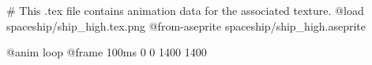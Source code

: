# This .tex file contains animation data for the associated texture.
@load spaceship/ship_high.tex.png
@from-aseprite spaceship/ship_high.aseprite

@anim loop
	@frame 100ms 0 0 1400 1400
